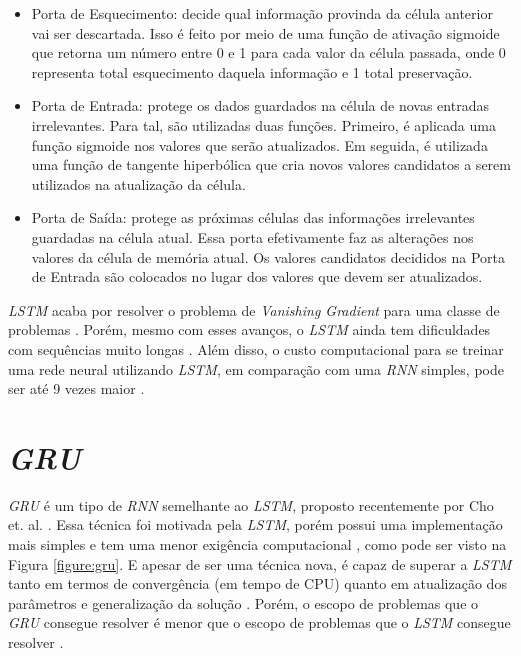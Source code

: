 \begin{itemize}
 \item Porta de Esquecimento: decide qual informação provinda da célula anterior vai ser descartada. Isso é feito por meio de uma função de ativação sigmoide que retorna um número entre 0 e 1 para cada valor da célula passada, onde 0 representa total esquecimento daquela informação e 1 total preservação.
 
 \item Porta de Entrada: protege os dados guardados na célula de novas entradas irrelevantes. Para tal, são utilizadas duas funções. Primeiro, é aplicada uma função sigmoide nos valores que serão atualizados. Em seguida, é utilizada uma função de tangente hiperbólica que cria novos valores candidatos a serem utilizados na atualização da célula.
 
 \item Porta de Saída: protege as próximas células das informações irrelevantes guardadas na célula atual. Essa porta efetivamente faz as alterações nos valores da célula de memória atual. Os valores candidatos decididos na Porta de Entrada são colocados no lugar dos valores que devem ser atualizados.
\end{itemize}

\textit{\acrshort{LSTM}} acaba por resolver o problema de \textit{Vanishing Gradient} para uma classe de problemas \cite{doi:10.1162/neco.1997.9.8.1735}. Porém, mesmo com esses avanços, o \textit{\acrshort{LSTM}} ainda tem dificuldades com sequências muito longas \cite{alex2012}. Além disso, o custo computacional para se treinar uma rede neural utilizando \textit{\acrshort{LSTM}}, em comparação com uma \textit{\acrshort{RNN}} simples, pode ser até 9 vezes maior \cite{doi:10.1162/neco.1997.9.8.1735}.

\section{\textit{\acrfull{GRU}}}

\textit{\acrshort{GRU}} é um tipo de \textit{\acrshort{RNN}} semelhante ao \textit{\acrshort{LSTM}}, proposto recentemente por Cho et. al. \cite{cho2014}. Essa técnica foi motivada pela \textit{\acrshort{LSTM}}, porém possui uma implementação mais simples e tem uma menor exigência computacional \cite{cho2014}, como pode ser visto na Figura \ref{figure:gru}. E apesar de ser uma técnica nova, é capaz de superar a \textit{\acrshort{LSTM}} tanto em termos de convergência (em tempo de CPU) quanto em atualização dos parâmetros e generalização da solução \cite{chung2014empirical}. Porém, o escopo de problemas que o \textit{\acrshort{GRU}} consegue resolver é menor que o escopo de problemas que o \textit{\acrshort{LSTM}} consegue resolver \cite{weiss2018}.

